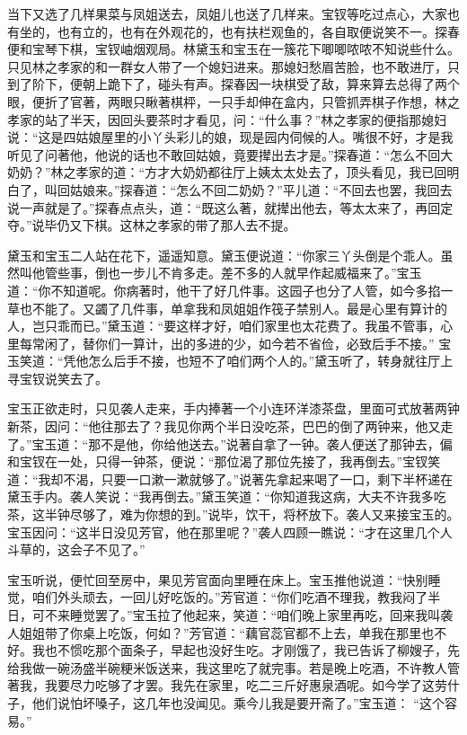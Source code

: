 \begin{parag}
    当下又选了几样果菜与凤姐送去，凤姐儿也送了几样来。宝钗等吃过点心，大家也有坐的，也有立的，也有在外观花的，也有扶栏观鱼的，各自取便说笑不一。探春便和宝琴下棋，宝钗岫烟观局。林黛玉和宝玉在一簇花下唧唧哝哝不知说些什么。只见林之孝家的和一群女人带了一个媳妇进来。那媳妇愁眉苦脸，也不敢进厅，只到了阶下，便朝上跪下了，碰头有声。探春因一块棋受了敌，算来算去总得了两个眼，便折了官著，两眼只瞅著棋枰，一只手却伸在盒内，只管抓弄棋子作想，林之孝家的站了半天，因回头要茶时才看见，问：“什么事？”林之孝家的便指那媳妇说：“这是四姑娘屋里的小丫头彩儿的娘，现是园内伺候的人。嘴很不好，才是我听见了问著他，他说的话也不敢回姑娘，竟要撵出去才是。”探春道：“怎么不回大奶奶？”林之孝家的道：“方才大奶奶都往厅上姨太太处去了，顶头看见，我已回明白了，叫回姑娘来。”探春道：“怎么不回二奶奶？”平儿道：“不回去也罢，我回去说一声就是了。”探春点点头，道：“既这么著，就撵出他去，等太太来了，再回定夺。”说毕仍又下棋。这林之孝家的带了那人去不提。
\end{parag}


\begin{parag}
    黛玉和宝玉二人站在花下，遥遥知意。黛玉便说道：“你家三丫头倒是个乖人。虽然叫他管些事，倒也一步儿不肯多走。差不多的人就早作起威福来了。”宝玉道：“你不知道呢。你病著时，他干了好几件事。这园子也分了人管，如今多掐一草也不能了。又蠲了几件事，单拿我和凤姐姐作筏子禁别人。最是心里有算计的人，岂只乖而已。”黛玉道：“要这样才好，咱们家里也太花费了。我虽不管事，心里每常闲了，替你们一算计，出的多进的少，如今若不省俭，必致后手不接。” 宝玉笑道：“凭他怎么后手不接，也短不了咱们两个人的。”黛玉听了，转身就往厅上寻宝钗说笑去了。
\end{parag}


\begin{parag}
    宝玉正欲走时，只见袭人走来，手内捧著一个小连环洋漆茶盘，里面可式放著两钟新茶，因问：“他往那去了？我见你两个半日没吃茶，巴巴的倒了两钟来，他又走了。”宝玉道：“那不是他，你给他送去。”说著自拿了一钟。袭人便送了那钟去，偏和宝钗在一处，只得一钟茶，便说：“那位渴了那位先接了，我再倒去。”宝钗笑道：“我却不渴，只要一口漱一漱就够了。”说著先拿起来喝了一口，剩下半杯递在黛玉手内。袭人笑说：“我再倒去。”黛玉笑道：“你知道我这病，大夫不许我多吃茶，这半钟尽够了，难为你想的到。”说毕，饮干，将杯放下。袭人又来接宝玉的。宝玉因问：“这半日没见芳官，他在那里呢？”袭人四顾一瞧说：“才在这里几个人斗草的，这会子不见了。”
\end{parag}


\begin{parag}
    宝玉听说，便忙回至房中，果见芳官面向里睡在床上。宝玉推他说道：“快别睡觉，咱们外头顽去，一回儿好吃饭的。”芳官道：“你们吃酒不理我，教我闷了半日，可不来睡觉罢了。”宝玉拉了他起来，笑道：“咱们晚上家里再吃，回来我叫袭人姐姐带了你桌上吃饭，何如？”芳官道：“藕官蕊官都不上去，单我在那里也不好。我也不惯吃那个面条子，早起也没好生吃。才刚饿了，我已告诉了柳嫂子，先给我做一碗汤盛半碗粳米饭送来，我这里吃了就完事。若是晚上吃酒，不许教人管著我，我要尽力吃够了才罢。我先在家里，吃二三斤好惠泉酒呢。如今学了这劳什子，他们说怕坏嗓子，这几年也没闻见。乘今儿我是要开斋了。”宝玉道： “这个容易。”
\end{parag}


